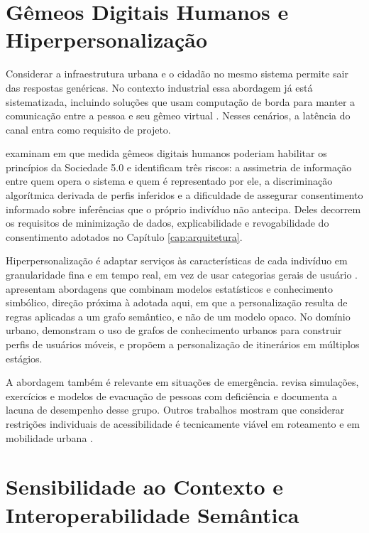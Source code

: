 \section{Gêmeos Digitais Humanos e Hiperpersonalização}
\label{sec:hdt}

Considerar a infraestrutura urbana e o cidadão no mesmo sistema permite sair das respostas genéricas. No contexto industrial essa abordagem já está sistematizada, incluindo soluções que usam computação de borda para manter a comunicação entre a pessoa e seu gêmeo virtual \cite{asad2023human,okegbile2022edge}. Nesses cenários, a latência do canal entra como requisito de projeto.

 examinam em que medida gêmeos digitais humanos poderiam habilitar os princípios da Sociedade 5.0 e identificam três riscos: a assimetria de informação entre quem opera o sistema e quem é representado por ele, a discriminação algorítmica derivada de perfis inferidos e a dificuldade de assegurar consentimento informado sobre inferências que o próprio indivíduo não antecipa. Deles decorrem os requisitos de minimização de dados, explicabilidade e revogabilidade do consentimento adotados no Capítulo \ref{cap:arquitetura}.

Hiperpersonalização é adaptar serviços às características de cada indivíduo em granularidade fina e em tempo real, em vez de usar categorias gerais de usuário \cite{desai2022hyper}.  apresentam abordagens que combinam modelos estatísticos e conhecimento simbólico, direção próxima à adotada aqui, em que a personalização resulta de regras aplicadas a um grafo semântico, e não de um modelo opaco. No domínio urbano,  demonstram o uso de grafos de conhecimento urbanos para construir perfis de usuários móveis, e  propõem a personalização de itinerários em múltiplos estágios.

A abordagem também é relevante em situações de emergência.  revisa simulações, exercícios e modelos de evacuação de pessoas com deficiência e documenta a lacuna de desempenho desse grupo. Outros trabalhos mostram que considerar restrições individuais de acessibilidade é tecnicamente viável em roteamento e em mobilidade urbana \cite{deng2022semantic,allahbakhshi2026zuriact}.

\section{Sensibilidade ao Contexto e Interoperabilidade Semântica}
\label{sec:contexto}

